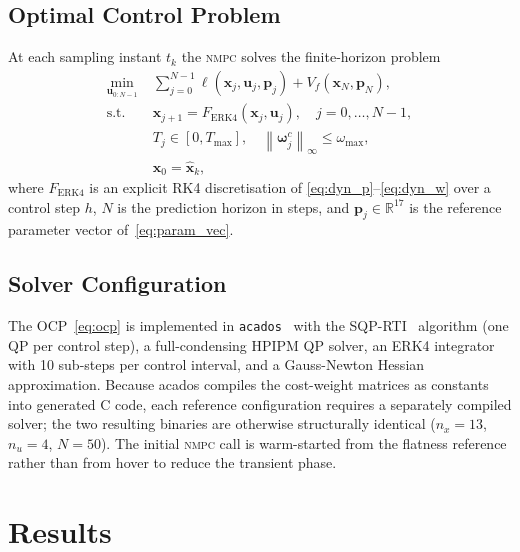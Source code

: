 \documentclass{ieeeaccess}
\newcommand{\R}{\mathbb{R}}
\newcommand{\norm}[1]{\left\| #1 \right\|}
\newcommand{\vect}[1]{\bm{#1}}
\newcommand{\st}{\text{s.t.}}
\newcommand{\nmpc}{\textsc{nmpc}}
\begin{document}
\subsection{Optimal Control Problem}
\label{sec:ocp}

At each sampling instant $t_k$ the \nmpc{} solves the finite-horizon
problem
%
\begin{subequations}
\label{eq:ocp}
\begin{align}
  \min_{\vect{u}_{0:N-1}}\;&
     \sum_{j=0}^{N-1}\ell(\vect{x}_j,\vect{u}_j,\vect{p}_j)
     + V_f(\vect{x}_N,\vect{p}_N), \label{eq:ocp_cost}\\
  \st\quad & \vect{x}_{j+1}=F_\text{ERK4}(\vect{x}_j,\vect{u}_j),
     \quad j=0,\ldots,N{-}1, \label{eq:ocp_dyn}\\
  & T_j\in[0,T_{\max}],\quad
    \norm{\vect{\omega}_j^c}_\infty\leq\omega_{\max}, \label{eq:ocp_input}\\
  & \vect{x}_0=\hat{\vect{x}}_k, \label{eq:ocp_ic}
\end{align}
\end{subequations}
where $F_\text{ERK4}$ is an explicit RK4 discretisation of
\eqref{eq:dyn_p}--\eqref{eq:dyn_w} over a control step $h$, $N$ is the
prediction horizon in steps, and $\vect{p}_j\in\R^{17}$ is the reference
parameter vector of~\eqref{eq:param_vec}.

\subsection{Solver Configuration}
\label{sec:solver}

The OCP~\eqref{eq:ocp} is implemented in
\texttt{acados}~\cite{verschueren2022acados} with the
SQP-RTI~\cite{diehl2005real} algorithm (one QP per control step), a
full-condensing HPIPM QP solver, an ERK4 integrator with 10 sub-steps
per control interval, and a Gauss-Newton Hessian approximation.
Because acados compiles the cost-weight matrices as constants into
generated C code, each reference configuration requires a separately
compiled solver; the two resulting binaries are otherwise structurally
identical ($n_x=13$, $n_u=4$, $N=50$).
The initial \nmpc{} call is warm-started from the flatness reference
rather than from hover to reduce the transient phase.

\section{Results}
\label{sec:results}
\end{document}
